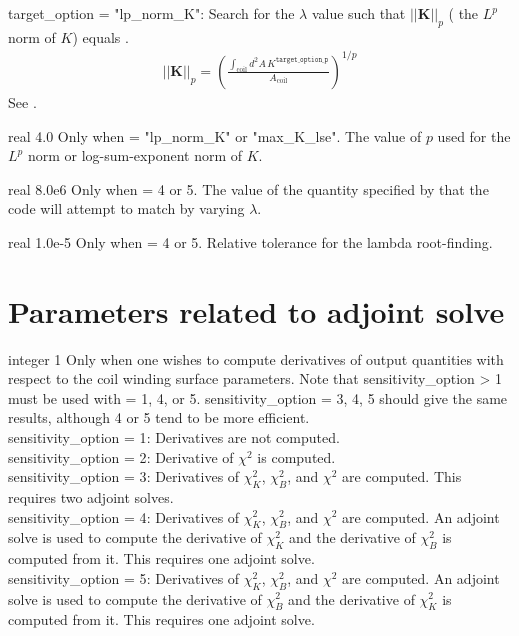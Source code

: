 {{\ttfamily target\_option = "lp\_norm\_K"}: Search for the $\lambda$ value such that $|| \bm{K} ||_p$ ( the $L^p$ norm of $K$) equals .
\begin{gather}
|| {\bm{K}} ||_p = \left( \frac{\int_{\text{coil}} d^2 A \, K^{\texttt{target\_option\_p}} }{A_{\text{coil}}} \right)^{1/p}
\end{gather}
See .

}

\myhrule

{real}
{4.0}
{Only when  = {\ttfamily "lp\_norm\_K"} or {\ttfamily "max\_K\_lse"}.}
{The value of $p$ used for the $L^p$ norm or log-sum-exponent norm of $K$.}

\myhrule

{real}
{8.0e6}
{Only when  = 4 or 5.}
{The value of the quantity specified by  that the code will attempt to match
by varying $\lambda$.
}

\myhrule

{real}
{1.0e-5}
{Only when  = 4 or 5.}
{Relative tolerance for the lambda root-finding.}

\myhrule

\section{Parameters related to adjoint solve}

{integer}
{1}
{Only when one wishes to compute derivatives of output quantities with respect to the coil winding surface parameters. Note that {\ttfamily sensitivity\_option > 1} must be used with  = 1, 4, or 5. {\ttfamily sensitivity\_option = 3, 4, 5} should give the same results, although 4 or 5 tend to be more efficient. }
{\\
{\ttfamily sensitivity\_option = 1}: Derivatives are not computed. \\
{\ttfamily sensitivity\_option = 2}: Derivative of $\chi^2$ is computed. \\
{\ttfamily sensitivity\_option = 3}: Derivatives of $\chi^2_K$, $\chi^2_B$, and $\chi^2$ are computed. This requires two adjoint solves. \\
{\ttfamily sensitivity\_option = 4}: Derivatives of $\chi^2_K$, $\chi^2_B$, and $\chi^2$ are computed. An adjoint solve is used to compute the derivative of $\chi^2_K$ and the derivative of $\chi^2_B$ is computed from it. This requires one adjoint solve. \\
{\ttfamily sensitivity\_option = 5}: Derivatives of $\chi^2_K$, $\chi^2_B$, and $\chi^2$ are computed. An adjoint solve is used to compute the derivative of $\chi^2_B$ and the derivative of $\chi^2_K$ is computed from it. This requires one adjoint solve. 
}

